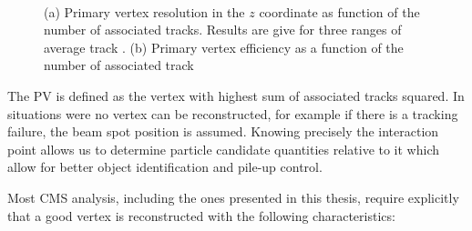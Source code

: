 \begin{figure}[htp]%
\centering
{}\qquad
{}\\
\caption[Primary vertex resolution in the $z$ coordinate and vertex reconstruction efficiency as a function of the number of constituent tracks.]{(a) Primary vertex resolution in the $z$ coordinate as function of the number of associated tracks. Results are give for three ranges of average track \pt. (b) Primary vertex efficiency as a function of the number of associated track~\cite{ARTICLE:CMSTrackingAndPrimaryVertex}}
\label{FIGURE:EventReconstructionAndSimulation_Vertex}
\end{figure}

The \gls{PV} is defined as the vertex with highest sum of associated tracks \pt squared. In situations were no vertex can be reconstructed, for example if there is a tracking failure, the beam spot position is assumed. Knowing precisely the interaction point allows us to determine particle candidate quantities relative to it which allow for better object identification and pile-up control. 

\newpage
Most \gls{CMS} analysis, including the ones presented in this thesis, require explicitly that a good vertex is reconstructed with the following characteristics:

